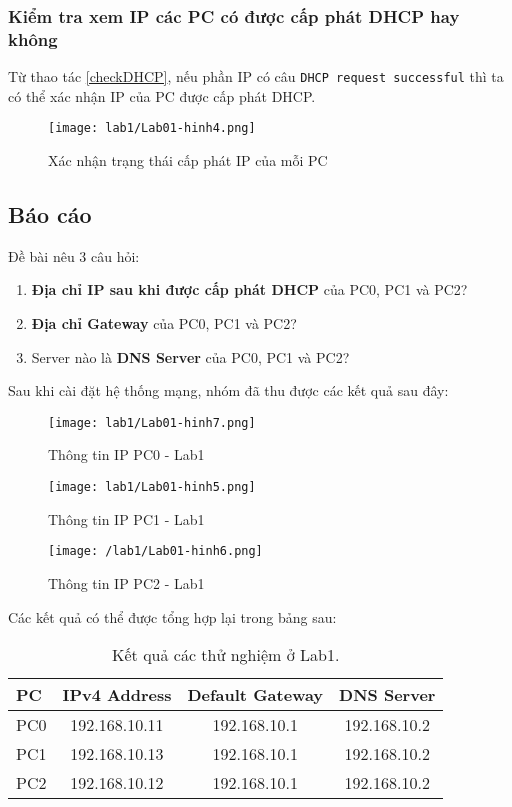 \documentclass[]{article}
\begin{document}
\subsubsection{Kiểm tra xem IP các PC có được cấp phát DHCP hay không}\label{capPhatDHCP}
Từ thao tác \ref{checkDHCP}, nếu phần IP có câu \texttt{DHCP request successful} thì ta có thể xác nhận IP của PC được cấp phát DHCP.
\begin{figure}[H]
    \centering
    \texttt{[image: lab1/Lab01-hinh4.png]}
    \caption{Xác nhận trạng thái cấp phát IP của mỗi PC}
\end{figure}

\subsection{Báo cáo}
Đề bài nêu 3 câu hỏi:
\begin{enumerate}
    \item \textbf{Địa chỉ IP sau khi được cấp phát DHCP} của PC0, PC1 và PC2?
    \item \textbf{Địa chỉ Gateway} của PC0, PC1 và PC2?
    \item Server nào là \textbf{DNS Server} của PC0, PC1 và PC2?
\end{enumerate}
Sau khi cài đặt hệ thống mạng, nhóm đã thu được các kết quả sau đây:
\begin{figure}[H]
    \centering
    \texttt{[image: lab1/Lab01-hinh7.png]}
    \caption{Thông tin IP PC0 - Lab1}
\end{figure}
\begin{figure}[H]
    \centering
    \texttt{[image: lab1/Lab01-hinh5.png]}
    \caption{Thông tin IP PC1 - Lab1}
\end{figure}
\begin{figure}[H]
    \centering
    \texttt{[image: /lab1/Lab01-hinh6.png]}
    \caption{Thông tin IP PC2 - Lab1}
\end{figure}
Các kết quả có thể được tổng hợp lại trong bảng sau:
\begin{table}[H]
    \centering
    \caption{Kết quả các thử nghiệm ở Lab1.}
    \begin{tabular}[t]{lccc}
        \toprule
        PC&IPv4 Address&Default Gateway&DNS Server\\
        \midrule
        PC0&192.168.10.11&192.168.10.1&192.168.10.2\\
        PC1&192.168.10.13&192.168.10.1&192.168.10.2\\
        PC2&192.168.10.12&192.168.10.1&192.168.10.2\\
        \bottomrule
    \end{tabular}
\end{table}
\end{document}
